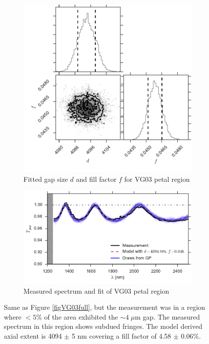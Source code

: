 \begin{figure}[htbp]
        \centering
        \begin{subfigure}[b]{0.5\textwidth}
              \includegraphics[width=\textwidth]{chSiGaps/figs/VG03p2_corner.pdf}
              \caption{Fitted gap size $d$ and fill factor $f$ for VG03 petal region}
		\label{figVG03p2_corner}
        \end{subfigure}

        \begin{subfigure}[b]{0.5\textwidth}
                \includegraphics[width=\textwidth]{chSiGaps/figs/VG03_f045.pdf}
                \caption{Measured spectrum and fit of VG03 petal region}
                \label{figVG03_f045}
        \end{subfigure}
\caption{ Same as Figure \ref{figVG03full}, but the measurement was in a region where $<5\%$ of the area exhibited the $\sim4\; \mu$m gap.  The measured spectrum in this region shows subdued fringes. The model derived axial extent is 4094 $\pm$ 5 nm covering a fill factor of 4.58 $\pm$ 0.06$\%$. \label{figVG03part}}
\end{figure}


